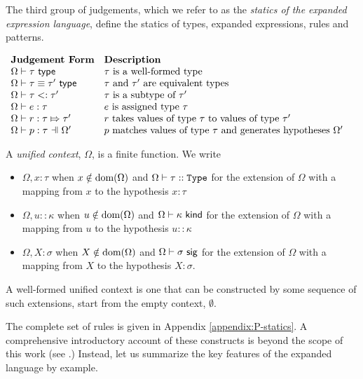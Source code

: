 The third group of judgements, which we refer to as the \emph{statics of the expanded expression language}, define the statics of types, expanded expressions, rules and patterns.

\vspace{5px}
$\begin{array}{ll}
\textbf{Judgement Form} & \textbf{Description}\\
\istypeP{\Omega}{\tau} & \text{$\tau$ is a well-formed type}\\
\tequalPX{\tau}{\tau'} & \text{$\tau$ and $\tau'$ are equivalent types}\\
\issubtypePX{\tau}{\tau'} & \text{$\tau$ is a subtype of $\tau'$}\\
\hastypeP{\Omega}{e}{\tau} & \text{$e$ is assigned type $\tau$}\\
\ruleTypeP{\Omega}{r}{\tau}{\tau'} & \text{$r$ takes values of type $\tau$ to values of type $\tau'$}\\
\patTypeP{\Omega'}{p}{\tau} & \text{$p$ matches values of type $\tau$ and generates hypotheses $\Omega'$} 
\end{array}$
\vspace{5px}


A \emph{unified context}, $\Omega$, is a finite function. 
We write
\begin{itemize}
\item $\Omega, x : \tau$ when $x \notin \text{dom}(\Omega)$ and $\Omega \vdash \tau :: \texttt{Type}$ for the extension of $\Omega$ with a mapping from $x$ to the hypothesis $x : \tau$
\item $\Omega, u :: \kappa$ when $u \notin \text{dom}(\Omega)$ and $\Omega \vdash \kappa~\mathsf{kind}$ for the extension of $\Omega$ with a mapping from $u$ to the hypothesis $u :: \kappa$
\item $\Omega, X : \sigma$ when $X \notin \text{dom}(\Omega)$ and $\Omega \vdash \sigma~\mathsf{sig}$ for the extension of $\Omega$ with a mapping from $X$ to the hypothesis $X : \sigma$.
\end{itemize}
A well-formed unified context is one that can be constructed by some sequence of such extensions, start from the empty context, $\emptyset$.

The complete set of rules is given in Appendix \ref{appendix:P-statics}. A comprehensive introductory account of these constructs is beyond the scope of this work (see \cite{pfpl}.) Instead, let us summarize the key features of the expanded language by example. 

